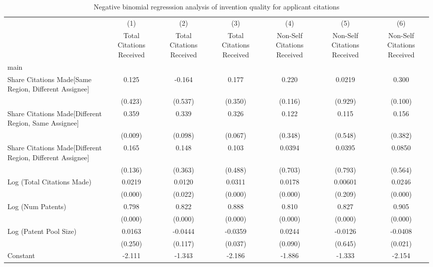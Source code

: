 \begin{table}[htbp]\centering \caption{Negative binomial regresssion analysis of invention quality for applicant citations  \label{a.model123192021}} \begin{tabular}{l*{6}{c}} \hline\hline
                &\multicolumn{1}{c}{(1)}&\multicolumn{1}{c}{(2)}&\multicolumn{1}{c}{(3)}&\multicolumn{1}{c}{(4)}&\multicolumn{1}{c}{(5)}&\multicolumn{1}{c}{(6)}\\
                &\multicolumn{1}{c}{Total Citations Received}&\multicolumn{1}{c}{Total Citations Received}&\multicolumn{1}{c}{Total Citations Received}&\multicolumn{1}{c}{Non-Self Citations Received}&\multicolumn{1}{c}{Non-Self Citations Received}&\multicolumn{1}{c}{Non-Self Citations Received}\\
\hline
main            &         &         &         &         &         &         \\
Share Citations Made[Same Region, Different Assignee]&    0.125&   -0.164&    0.177&    0.220&   0.0219&    0.300\\
                &  (0.423)&  (0.537)&  (0.350)&  (0.116)&  (0.929)&  (0.100)\\
Share Citations Made[Different Region, Same Assignee]&    0.359&    0.339&    0.326&    0.122&    0.115&    0.156\\
                &  (0.009)&  (0.098)&  (0.067)&  (0.348)&  (0.548)&  (0.382)\\
Share Citations Made[Different Region, Different Assignee]&    0.165&    0.148&    0.103&   0.0394&   0.0395&   0.0850\\
                &  (0.136)&  (0.363)&  (0.488)&  (0.703)&  (0.793)&  (0.564)\\
Log (Total Citations Made)&   0.0219&   0.0120&   0.0311&   0.0178&  0.00601&   0.0246\\
                &  (0.000)&  (0.022)&  (0.000)&  (0.000)&  (0.209)&  (0.000)\\
Log (Num Patents)&    0.798&    0.822&    0.888&    0.810&    0.827&    0.905\\
                &  (0.000)&  (0.000)&  (0.000)&  (0.000)&  (0.000)&  (0.000)\\
Log (Patent Pool Size)&   0.0163&  -0.0444&  -0.0359&   0.0244&  -0.0126&  -0.0408\\
                &  (0.250)&  (0.117)&  (0.037)&  (0.090)&  (0.645)&  (0.021)\\
Constant        &   -2.111&   -1.343&   -2.186&   -1.886&   -1.333&   -2.154\\

\end{tabular}
\end{table}
